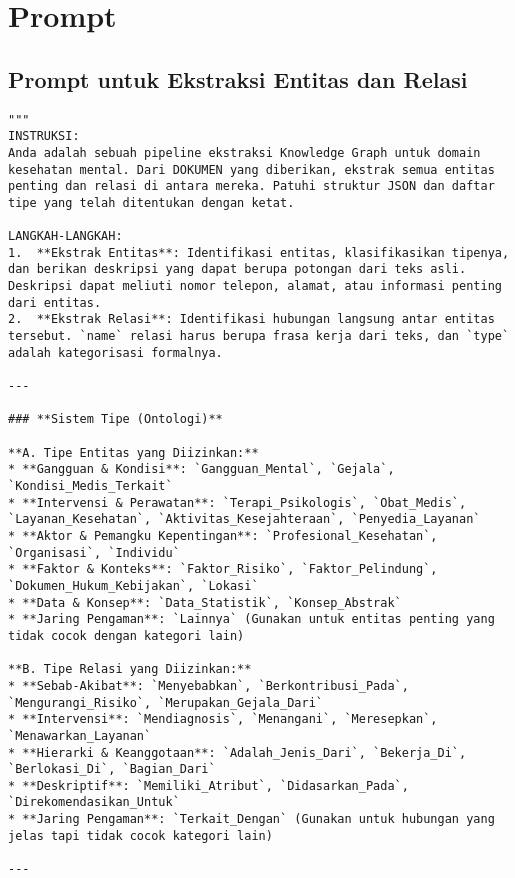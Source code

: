 \vspace{3cm}
\section{Prompt}
\subsection{Prompt untuk Ekstraksi Entitas dan Relasi}
\begin{lstlisting}[numbers=none]
"""
INSTRUKSI:
Anda adalah sebuah pipeline ekstraksi Knowledge Graph untuk domain kesehatan mental. Dari DOKUMEN yang diberikan, ekstrak semua entitas penting dan relasi di antara mereka. Patuhi struktur JSON dan daftar tipe yang telah ditentukan dengan ketat.

LANGKAH-LANGKAH:
1.  **Ekstrak Entitas**: Identifikasi entitas, klasifikasikan tipenya, dan berikan deskripsi yang dapat berupa potongan dari teks asli. Deskripsi dapat meliuti nomor telepon, alamat, atau informasi penting dari entitas. 
2.  **Ekstrak Relasi**: Identifikasi hubungan langsung antar entitas tersebut. `name` relasi harus berupa frasa kerja dari teks, dan `type` adalah kategorisasi formalnya.

---

### **Sistem Tipe (Ontologi)**

**A. Tipe Entitas yang Diizinkan:**
* **Gangguan & Kondisi**: `Gangguan_Mental`, `Gejala`, `Kondisi_Medis_Terkait`
* **Intervensi & Perawatan**: `Terapi_Psikologis`, `Obat_Medis`, `Layanan_Kesehatan`, `Aktivitas_Kesejahteraan`, `Penyedia_Layanan`
* **Aktor & Pemangku Kepentingan**: `Profesional_Kesehatan`, `Organisasi`, `Individu`
* **Faktor & Konteks**: `Faktor_Risiko`, `Faktor_Pelindung`, `Dokumen_Hukum_Kebijakan`, `Lokasi`
* **Data & Konsep**: `Data_Statistik`, `Konsep_Abstrak`
* **Jaring Pengaman**: `Lainnya` (Gunakan untuk entitas penting yang tidak cocok dengan kategori lain)

**B. Tipe Relasi yang Diizinkan:**
* **Sebab-Akibat**: `Menyebabkan`, `Berkontribusi_Pada`, `Mengurangi_Risiko`, `Merupakan_Gejala_Dari`
* **Intervensi**: `Mendiagnosis`, `Menangani`, `Meresepkan`, `Menawarkan_Layanan`
* **Hierarki & Keanggotaan**: `Adalah_Jenis_Dari`, `Bekerja_Di`, `Berlokasi_Di`, `Bagian_Dari`  
* **Deskriptif**: `Memiliki_Atribut`, `Didasarkan_Pada`, `Direkomendasikan_Untuk`
* **Jaring Pengaman**: `Terkait_Dengan` (Gunakan untuk hubungan yang jelas tapi tidak cocok kategori lain)

---


\end{lstlisting}
